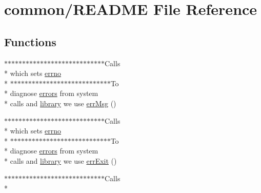 \hypertarget{common_2README}{\section{common/\-R\-E\-A\-D\-M\-E File Reference}
\label{common_2README}
}
\subsection*{Functions}
\begin{DoxyCompactItemize}
\item 
$\ast$$\ast$$\ast$$\ast$$\ast$$\ast$$\ast$$\ast$$\ast$$\ast$$\ast$$\ast$$\ast$$\ast$$\ast$$\ast$$\ast$$\ast$$\ast$$\ast$$\ast$$\ast$$\ast$$\ast$$\ast$$\ast$$\ast$$\ast$Calls \\*
which sets \hyperlink{common_2README_afe75ee0c7e5a90ba6bb38426ea69b996}{errno} \\*
$\ast$$\ast$$\ast$$\ast$$\ast$$\ast$$\ast$$\ast$$\ast$$\ast$$\ast$$\ast$$\ast$$\ast$$\ast$$\ast$$\ast$$\ast$$\ast$$\ast$$\ast$$\ast$$\ast$$\ast$$\ast$$\ast$$\ast$$\ast$To \\*
diagnose \hyperlink{common_2README_a9912daeb8cc621a6ee8e1d24ebdbe601}{errors} from system \\*
calls and \hyperlink{ClientServer_2server_2Makefile_a1f477410360bd4832116581b9934ab71}{library} we use \hyperlink{common_2README_a83413e40798cc613af12fa88a21035a5}{err\-Msg} ()
\item 
$\ast$$\ast$$\ast$$\ast$$\ast$$\ast$$\ast$$\ast$$\ast$$\ast$$\ast$$\ast$$\ast$$\ast$$\ast$$\ast$$\ast$$\ast$$\ast$$\ast$$\ast$$\ast$$\ast$$\ast$$\ast$$\ast$$\ast$$\ast$Calls \\*
which sets \hyperlink{common_2README_afe75ee0c7e5a90ba6bb38426ea69b996}{errno} \\*
$\ast$$\ast$$\ast$$\ast$$\ast$$\ast$$\ast$$\ast$$\ast$$\ast$$\ast$$\ast$$\ast$$\ast$$\ast$$\ast$$\ast$$\ast$$\ast$$\ast$$\ast$$\ast$$\ast$$\ast$$\ast$$\ast$$\ast$$\ast$To \\*
diagnose \hyperlink{common_2README_a9912daeb8cc621a6ee8e1d24ebdbe601}{errors} from system \\*
calls and \hyperlink{ClientServer_2server_2Makefile_a1f477410360bd4832116581b9934ab71}{library} we use \hyperlink{common_2README_a68943fd8366445b15b2c72863bbc5b01}{err\-Exit} ()
\item 
$\ast$$\ast$$\ast$$\ast$$\ast$$\ast$$\ast$$\ast$$\ast$$\ast$$\ast$$\ast$$\ast$$\ast$$\ast$$\ast$$\ast$$\ast$$\ast$$\ast$$\ast$$\ast$$\ast$$\ast$$\ast$$\ast$$\ast$$\ast$Calls \\*
$$
\end{DoxyCompactItemize}
